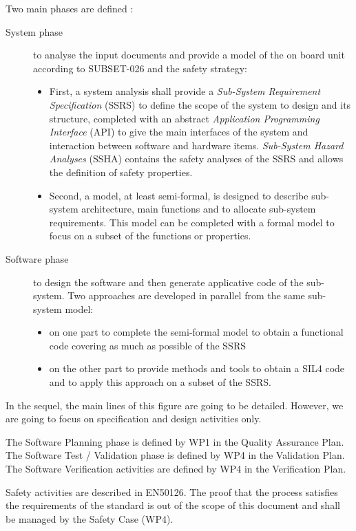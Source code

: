 Two main phases are defined :
\begin{description}
\item[System phase] to analyse the input documents and provide a model of the on
  board unit according to SUBSET-026 and the safety strategy:
\begin{itemize}
\item First, a system analysis shall provide a \textit{Sub-System Requirement Specification} (SSRS) to define the scope of the system to  design and its structure, completed with an abstract \textit{Application Programming Interface} (API) to  give the main interfaces of the system and interaction between software and hardware items. \textit{Sub-System Hazard Analyses} (SSHA) contains the safety analyses of the SSRS and  allows the definition of safety properties.
\item Second, a model, at least semi-formal, is designed to describe sub-system
  architecture, main functions and to allocate sub-system requirements. This
  model can be completed with a formal model to focus on a subset of the
  functions or properties.
\end{itemize}
\item[Software phase] to design the software and then generate applicative code
  of the sub-system. Two approaches are developed in parallel from the same
  sub-system model:
\begin{itemize}
\item on one part to complete the semi-formal model to obtain a functional code covering as much as possible of the SSRS
\item on the other part to provide methods and tools to  obtain a SIL4 code and to apply this approach on a subset of the SSRS.
\end{itemize}
\end{description} 

In the sequel, the main lines of this figure are going to be detailed. However, we are going to focus on specification and design activities only.

The Software Planning phase is defined by WP1 in the Quality Assurance Plan.
The Software Test / Validation phase is defined by WP4 in the Validation Plan.
The Software Verification activities are defined by WP4 in the Verification Plan.

Safety activities are described in EN50126.
The proof that the process satisfies the requirements of the standard is out of the scope of this document and shall be managed by the Safety Case (WP4).



